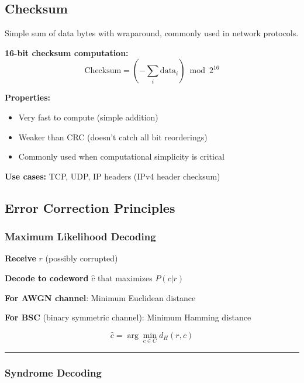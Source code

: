 \subsection{Checksum}

Simple sum of data bytes with wraparound, commonly used in network protocols.

\textbf{16-bit checksum computation:}
\begin{equation}
\text{Checksum} = \left(-\sum_{i} \text{data}_i\right) \bmod 2^{16}
\label{eq:checksum}
\end{equation}

\textbf{Properties:}
\begin{itemize}
\item Very fast to compute (simple addition)
\item Weaker than CRC (doesn't catch all bit reorderings)
\item Commonly used when computational simplicity is critical
\end{itemize}

\textbf{Use cases:} TCP, UDP, IP headers (IPv4 header checksum)

\subsection{Error Correction
Principles}\label{error-correction-principles}

\subsubsection{Maximum Likelihood
Decoding}\label{maximum-likelihood-decoding}

\textbf{Receive} \(r\) (possibly corrupted)

\textbf{Decode to codeword} \(\hat{c}\) that maximizes \(P(c | r)\)

\textbf{For AWGN channel}: Minimum Euclidean distance

\textbf{For BSC} (binary symmetric channel): Minimum Hamming distance

\[
\hat{c} = \arg\min_{c \in C} d_H(r, c)
\]

\begin{center}\rule{0.5\linewidth}{0.5pt}\end{center}

\subsubsection{Syndrome Decoding}\label{syndrome-decoding}

